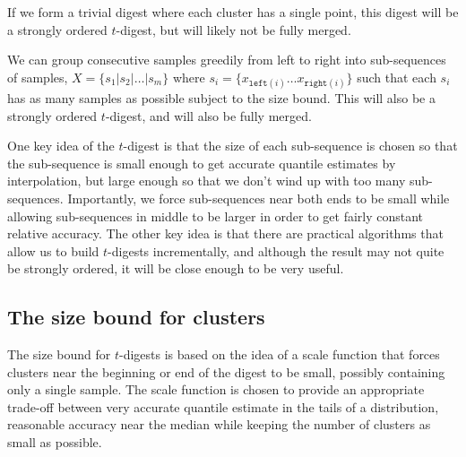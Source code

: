 \documentclass[11pt]{amsart}
\begin{document}
If we form a trivial digest where each cluster has a single point, this digest will be a strongly ordered $t$-digest, but will likely not be fully merged.

We can group consecutive samples greedily from left to right into sub-sequences of samples, $X = \lbrace s_1 | s_2 | \ldots | s_m \rbrace$ where $s_i = \lbrace x_{\mathtt {left}(i)} \ldots x_{\mathtt{right}(i)} \rbrace$ such that each $s_i$ has as many samples as possible subject to the size bound. This will also be a strongly ordered $t$-digest, and will also be fully merged.

One key idea of the $t$-digest is that the size of each sub-sequence is chosen so that the sub-sequence is small enough to get accurate quantile estimates by interpolation, but large enough so that we don't wind up with too many sub-sequences. Importantly, we force sub-sequences near both ends to be small while allowing sub-sequences in middle to be larger in order to get fairly constant relative accuracy. The other key idea is that there are practical algorithms that allow us to build $t$-digests incrementally, and although the result may not quite be strongly ordered, it will be close enough to be very useful.

\subsection{The size bound for clusters}
The size bound for $t$-digests is based on the idea of a scale function that forces clusters near the beginning or end of the digest to be small, possibly containing only a single sample. The scale function is chosen to provide an appropriate trade-off between very accurate quantile estimate in the tails of a distribution, reasonable accuracy near the median while keeping the number of clusters as small as possible.
\end{document}
